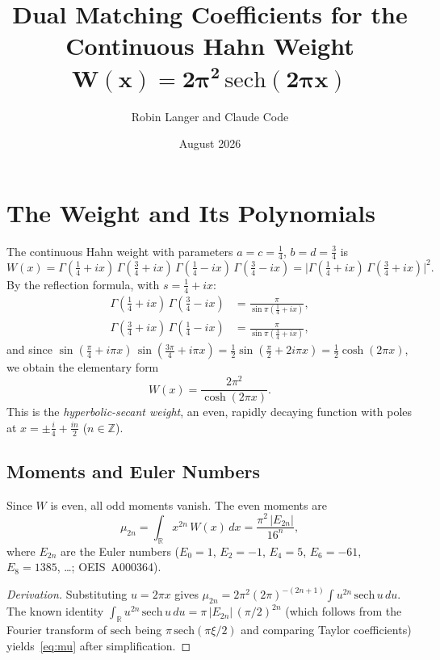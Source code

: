 \documentclass[11pt,a4paper]{article}
\title{\textbf{Dual Matching Coefficients for the Continuous Hahn Weight\\
$\boldsymbol{W(x) = 2\pi^2\,\mathrm{sech}(2\pi x)}$}}
\author{Robin Langer and Claude Code}
\date{August 2026}
\newcommand{\R}{\mathbb{R}}
\newcommand{\Z}{\mathbb{Z}}
\begin{document}
\maketitle

\section{The Weight and Its Polynomials}

The continuous Hahn weight with parameters $a = c = \tfrac14$,
$b = d = \tfrac34$ is
\[
  W(x) = \Gamma(\tfrac14+ix)\,\Gamma(\tfrac34+ix)\,
         \Gamma(\tfrac14-ix)\,\Gamma(\tfrac34-ix)
       = \bigl|\Gamma(\tfrac14+ix)\,\Gamma(\tfrac34+ix)\bigr|^2.
\]
By the reflection formula, with $s = \tfrac14 + ix$:
\begin{align*}
  \Gamma(\tfrac14+ix)\,\Gamma(\tfrac34-ix)
  &= \frac{\pi}{\sin\pi(\tfrac14+ix)}, \\
  \Gamma(\tfrac34+ix)\,\Gamma(\tfrac14-ix)
  &= \frac{\pi}{\sin\pi(\tfrac34+ix)},
\end{align*}
and since
$\sin(\tfrac\pi4 + i\pi x)\,\sin(\tfrac{3\pi}{4} + i\pi x)
= \tfrac12\sin(\tfrac\pi2 + 2i\pi x)
= \tfrac12\cosh(2\pi x)$,
we obtain the elementary form
\begin{equation}\label{eq:W}
  W(x) = \frac{2\pi^2}{\cosh(2\pi x)}.
\end{equation}
This is the \emph{hyperbolic-secant weight}, an even,
rapidly decaying function with poles at $x = \pm\tfrac{i}{4} + \tfrac{in}{2}$
($n \in \Z$).

\subsection{Moments and Euler Numbers}

Since $W$ is even, all odd moments vanish. The even moments are
\begin{equation}\label{eq:mu}
  \mu_{2n} = \int_\R x^{2n}\, W(x)\, dx
  = \frac{\pi^2\, |E_{2n}|}{16^n},
\end{equation}
where $E_{2n}$ are the Euler numbers ($E_0 = 1$, $E_2 = -1$,
$E_4 = 5$, $E_6 = -61$, $E_8 = 1385$, \ldots; OEIS~A000364).

\begin{proof}[Derivation]
Substituting $u = 2\pi x$ gives
$\mu_{2n} = 2\pi^2 (2\pi)^{-(2n+1)} \int u^{2n}\,\mathrm{sech}\,u\,du$.
The known identity
$\int_\R u^{2n}\,\mathrm{sech}\,u\,du = \pi\,|E_{2n}|\,(\pi/2)^{2n}$
(which follows from the Fourier transform of $\mathrm{sech}$ being
$\pi\,\mathrm{sech}(\pi\xi/2)$ and comparing Taylor coefficients)
yields~\eqref{eq:mu} after simplification.
\end{proof}
\end{document}
